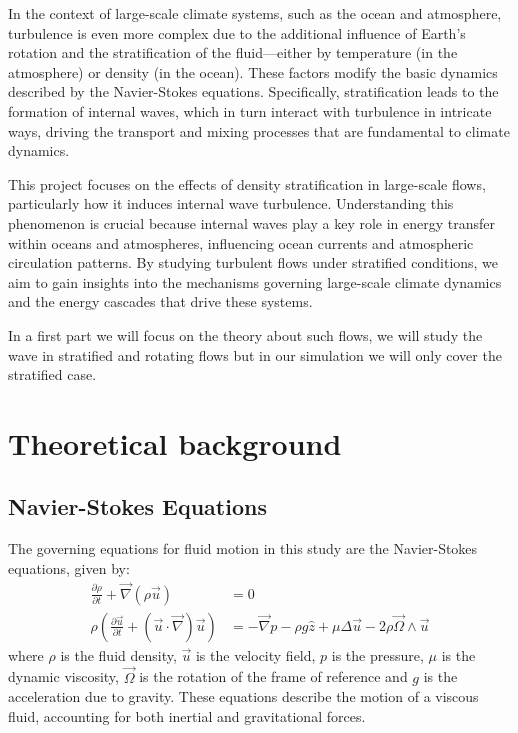 \documentclass[final,5p,times,twocolumn,authoryear]{elsarticle}
\newcommand{\pd}[2]{\frac{\partial #1}{\partial #2}}
\begin{document}
In the context of large-scale climate systems, such as the ocean and atmosphere, turbulence is even more complex due to the additional influence of Earth’s rotation and the stratification of the fluid—either by temperature (in the atmosphere) or density (in the ocean). These factors modify the basic dynamics described by the Navier-Stokes equations. Specifically, stratification leads to the formation of internal waves, which in turn interact with turbulence in intricate ways, driving the transport and mixing processes that are fundamental to climate dynamics.

This project focuses on the effects of density stratification in large-scale flows, particularly how it induces internal wave turbulence. Understanding this phenomenon is crucial because internal waves play a key role in energy transfer within oceans and atmospheres, influencing ocean currents and atmospheric circulation patterns. By studying turbulent flows under stratified conditions, we aim to gain insights into the mechanisms governing large-scale climate dynamics and the energy cascades that drive these systems.

In a first part we will focus on the theory about such flows, we will study the wave in stratified and rotating flows but in our simulation we will only cover the stratified case.


\section{Theoretical background}
\subsection{Navier-Stokes Equations}

The governing equations for fluid motion in this study are the Navier-Stokes equations, given by:
\begin{subequations}
\begin{align}
\pd{\rho}{t} + \vec{\nabla} \left( \rho \vec{u} \right) &= 0 \\
\rho \left( \pd{\vec{u}}{t} + \left( \vec{u} \cdot \vec{\nabla} \right) \vec{u} \right) &= - \vec{\nabla} p - \rho g \hat{z} + \mu \Delta \vec{u} - 2 \rho \vec{\Omega} \wedge \vec{u}
\end{align}
\label{eq:NS}
\end{subequations}
where $\rho$ is the fluid density, $\vec{u}$ is the velocity field, $p$ is the pressure, $\mu$ is the dynamic viscosity, $\vec{\Omega}$ is the rotation of the frame of reference and $g$ is the acceleration due to gravity. These equations describe the motion of a viscous fluid, accounting for both inertial and gravitational forces.
\end{document}
